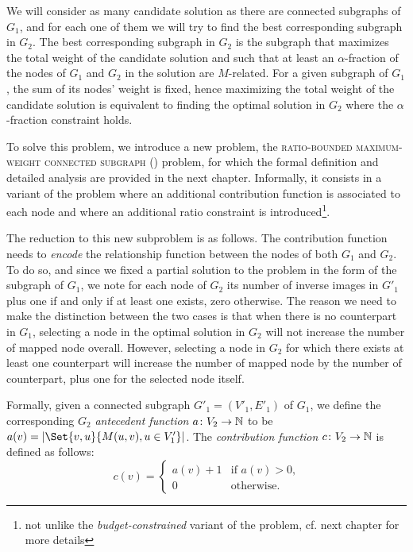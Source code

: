 			We will consider as many candidate solution as there are connected subgraphs of $G_1$, and for each one of them we will try to find the best corresponding subgraph in $G_2$.
			The best corresponding subgraph in $G_2$ is the subgraph that maximizes the total weight of the candidate solution and such that at least an $\alpha$-fraction of the nodes of $G_1$ and $G_2$ in the solution are $M$-related.
			For a given subgraph of $G_1$, the sum of its nodes' weight is fixed, hence maximizing the total weight of the candidate solution is equivalent to finding the optimal solution in $G_2$ where the $\alpha$-fraction constraint holds.

			To solve this problem, we introduce a new problem, the \textsc{ratio-bounded maximum-weight connected subgraph} (\rbmwcs) problem, for which the formal definition and detailed analysis are provided in the next chapter.
			Informally, it consists in a variant of the \mwcs{} problem where an additional contribution function is associated to each node and where an additional ratio constraint is introduced\footnote{not unlike the \emph{budget-constrained} variant of the \mwcs{} problem, cf. next chapter for more details}.

			The reduction to this new subproblem is as follows.
			The contribution function needs to \emph{encode} the relationship function between the nodes of both $G_1$ and $G_2$.
			To do so, and since we fixed a partial solution to the problem in the form of the subgraph of $G_1$, we note for each node of $G_2$ its number of inverse images in $G'_1$ plus one if and only if at least one exists, zero otherwise.
			The reason we need to make the distinction between the two cases is that when there is no counterpart in $G_1$, selecting a node in the optimal solution in $G_2$ will not increase the number of mapped node overall.
			However, selecting a node in $G_2$ for which there exists at least one counterpart will increase the number of mapped node by the number of counterpart, plus one for the selected node itself.

			Formally, given a connected subgraph $G'_1=(V'_1,E'_1)$ of $G_1$, we define the corresponding $G_2$ \emph{antecedent function} $a\colon V_2 \to \mathbb{N}$ to be $a(v)=\card{\Set{v,u}{M(u,v), u\in V'_1}}$.
			The \emph{contribution function} $c\colon V_2 \to \mathbb{N}$ is defined as follows:
			$$c(v)=\begin{cases}a(v) + 1 &\mbox{if }a(v) > 0\mbox{,} \\
		                       0        &\mbox{otherwise.}
		          \end{cases}$$

